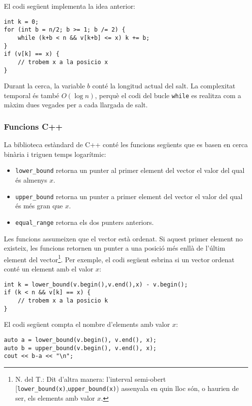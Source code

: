 El codi següent implementa la idea anterior:
\begin{lstlisting}
int k = 0;
for (int b = n/2; b >= 1; b /= 2) {
    while (k+b < n && v[k+b] <= x) k += b;
}
if (v[k] == x) {
    // trobem x a la posicio x
}
\end{lstlisting}

Durant la cerca, la variable $b$
conté la longitud actual del salt.
La complexitat temporal és també $O(\log n)$,
perquè el codi del bucle \texttt{while}
es realitza com a màxim dues vegades per a cada llargada de salt.

\subsubsection{Funcions C++}

La biblioteca estàndard de C++ conté les funcions següents
que es basen en cerca binària i triguen temps logarítmic:

\begin{itemize}
\item \texttt{lower\_bound} retorna un punter al
primer element del vector el valor del qual és almenys $x$.
\item \texttt{upper\_bound} retorna un punter a
primer element del vector el valor del qual és més gran que $x$.
\item \texttt{equal\_range} retorna els dos punters anteriors.
\end{itemize}

Les funcions assumeixen que el vector està ordenat.
Si aquest primer element no existeix, les funcions retornen un
punter a una posició més enllà de l'últim element del vector\footnote{
N. del T.: Dit d'altra manera: l'interval semi-obert
[\texttt{lower\_bound(x)},\texttt{upper\_bound(x)})
  assenyala en quin lloc són, o haurien de ser, els elements amb
  valor $x$.}.
Per exemple, el codi següent esbrina si
un vector ordenat conté un element amb el valor $x$:

\begin{lstlisting}
int k = lower_bound(v.begin(),v.end(),x) - v.begin();
if (k < n && v[k] == x) {
    // trobem x a la posicio k
}
\end{lstlisting}

El codi següent compta el nombre d'elements
amb valor $x$:

\begin{lstlisting}
auto a = lower_bound(v.begin(), v.end(), x);
auto b = upper_bound(v.begin(), v.end(), x);
cout << b-a << "\n";
\end{lstlisting}

